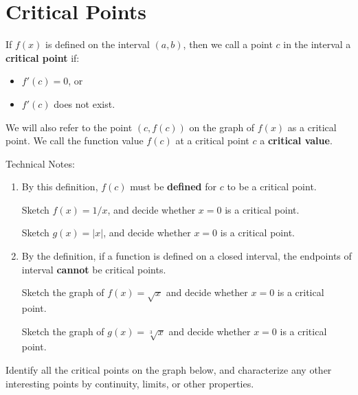 \newpage
{}

\section*{Critical Points} 

\begin{boxnote}

  If $f(x)$ is defined on the interval $(a,b)$, then we call a point
  $c$ in the interval a {\bf critical point} if:
\begin{itemize}
	\item $f'(c) = 0$, or
	\item $f'(c)$ does not exist.
\end{itemize}
We will also refer to the point $(c,f(c))$ on the graph of $f(x)$ as a
critical point.  We call the function value $f(c)$ at a critical point
$c$ a {\bf critical value}.

\vsc
\end{boxnote}

\newpage

Technical Notes:
\begin{enumerate} 
\item By this definition, $f(c)$ must be {\bf defined} for
  $c$ to be a critical point.  

  Sketch $f(x) = 1/x$, and decide whether $x=0$ is a
    critical point.

\vfill
  Sketch $g(x) = |x|$, and decide whether $x=0$ is a
    critical point.

\vfill

\newpage

\item By the definition, if a function is defined on a closed
  interval, the endpoints of interval {\bf cannot} be critical points.

  Sketch the graph of $f(x) = \sqrt{x}$ and decide
    whether $x=0$ is a critical point.

\vfill

\newpage

Sketch the graph of $g(x) = \sqrt[3]{x}$ and decide
  whether $x=0$ is a critical point.

\vfill

\end{enumerate}

\newpage

\problem Identify all the critical points on the graph below, and
  characterize any other interesting points by continuity, limits, or
  other properties.

